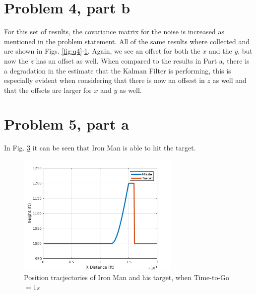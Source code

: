 \documentclass[paper=a4, fontsize=11pt]{scrartcl}
\numberwithin{equation}{section}		%
\numberwithin{figure}{section}			%
\numberwithin{table}{section}				%
\begin{document}
\section*{Problem 4, part b}

For this set of results, the covariance matrix for the noise is increased as mentioned in the problem statement. All of the same results where collected and are shown in Figs. \ref{fig:q4}-\ref{fig:q5}. Again, we see an offset for both the $x$ and the $y$, but now the $z$ has an offset as well.  When compared to the results in Part a, there is a degradation in the estimate that the Kalman Filter is performing, this is especially evident when considering that there is now an offsest in $z$ as well and that the offsets are larger for $x$ and $y$ as well.

\begin{figure}[!htb]
	\centering
    
	\caption{  \label{fig:q5}}
\end{figure}

\begin{figure}[!htb]
	\centering
    
	\caption{  \label{fig:q6}}
\end{figure}

\section*{Problem 5, part a}
In Fig. \ref{fig:f1} it can be seen that Iron Man is able to hit the target.
\begin{figure}[!htb]
	\centering
	\includegraphics[width=0.7\textwidth]{fivea}
	\caption{ Position tracjectories of Iron Man and his target, when Time-to-Go $= 1s$ \label{fig:f1}}
\end{figure}
\end{document}
